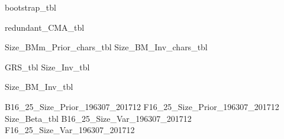 



\begin{landscape}
{bootstrap_tbl}
\end{landscape}
{redundant_CMA_tbl}

{Size_BMm_Prior_chars_tbl}
{Size_BM_Inv_chars_tbl}

{GRS_tbl}
{Size_Inv_tbl}
\begin{landscape}
{Size_BM_Inv_tbl}
\end{landscape}
{B16_25_Size_Prior_196307_201712}
{F16_25_Size_Prior_196307_201712}
{Size_Beta_tbl}
{B16_25_Size_Var_196307_201712}
{F16_25_Size_Var_196307_201712}

